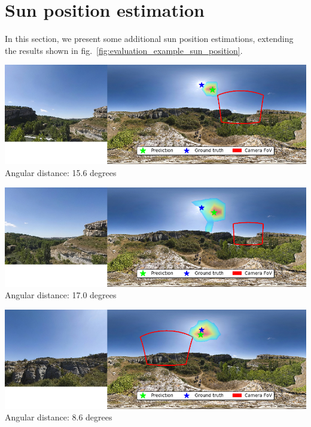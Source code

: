 \protect\hypertarget{sunpos}{}{}

\hypertarget{sun-position-estimation}{%
\section{Sun position estimation}\label{sun-position-estimation}}

In this section, we present some additional sun position estimations,
extending the results shown in fig.~\ref{fig:evaluation_example_sun_position}.


\def\mywidth{0.9\linewidth}

\begin{multicols}{2}

\includegraphics[width=\mywidth]{pano_aacuaoohjiliba_002.jpg}\\
Angular distance: 15.6 degrees

\includegraphics[width=\mywidth]{pano_aacuaoohjiliba_006.jpg}\\
Angular distance: 17.0 degrees

\includegraphics[width=\mywidth]{pano_aacuaoohjiliba_005.jpg}\\
Angular distance: 8.6 degrees


\end{multicols}
